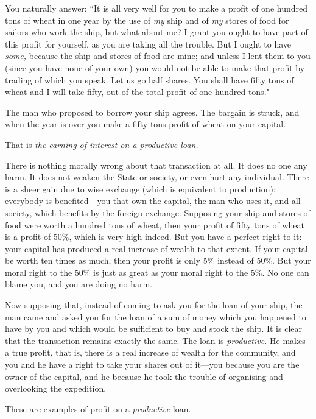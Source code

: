 \documentclass{book}
\begin{document}
You naturally answer: “It is all very well for you to make a profit of one hundred tons of wheat in one year by the use of \emph{my} ship and of \emph{my} stores of food for sailors who work the ship, but what about me? I grant you ought to have part of this profit for yourself, as you are taking all the trouble. But I ought to have \emph{some,} because the ship and stores of food are mine; and unless I lent them to you (since you have none of your own) you would not be able to make that profit by trading of which you speak. Let us go half shares. You shall have fifty tons of wheat and I will take fifty, out of the total profit of one hundred tons."

The man who proposed to borrow your ship agrees. The bargain is struck, and when the year is over you make a fifty tons profit of wheat on your capital.

That is \emph{the earning of interest on a productive loan.}

There is nothing morally wrong about that transaction at all. It does no one any harm. It does not weaken the State or society, or even hurt any individual. There is a sheer gain due to wise exchange (which is equivalent to production); everybody is benefited—you that own the capital, the man who uses it, and all society, which benefits by the foreign exchange. Supposing your ship and stores of food were worth a hundred tons of wheat, then your profit of fifty tons of wheat is a profit of 50\%, which is very high indeed. But you have a perfect right to it: your capital has produced a real increase of wealth to that extent. If your capital be worth ten times as much, then your profit is only 5\% instead of 50\%. But your moral right to the 50\% is just as great as your moral right to the 5\%. No one can blame you, and you are doing no harm.

Now supposing that, instead of coming to ask you for the loan of your ship, the man came and asked you for the loan of a sum of money which you happened to have by you and which would be sufficient to buy and stock the ship. It is clear that the transaction remains exactly the same. The loan is \emph{productive.} He makes a true profit, that is, there is a real increase of wealth for the community, and you and he have a right to take your shares out of it—you because you are the owner of the capital, and he because he took the trouble of organising and overlooking the expedition.

These are examples of profit on a \emph{productive} loan.
\end{document}
